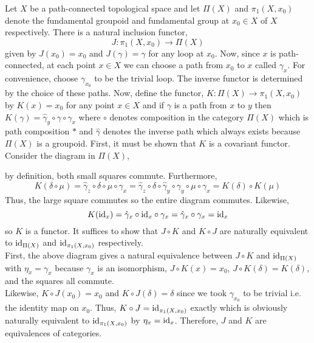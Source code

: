 \documentclass[12pt]{extarticle}
\begin{document}
Let $X$ be a path-connected topological space and let $\Pi(X)$ and $\pi_1(X, x_0)$ denote the fundamental groupoid and fundamental group at $x_0 \in X$ of $X$ respectively. There is a natural inclusion functor,
\[ J : \pi_1(X, x_0) \to \Pi(X) \]
given by $J(x_0) = x_0$ and $J(\gamma) = \gamma$ for any loop at $x_0$. Now, since $x$ is path-connected, at each point $x \in X$ we can choose a path from $x_0$ to $x$ called $\gamma_x$. For convenience, choose $\gamma_{x_0}$ to be the trivial loop. The inverse functor is determined by the choice of these paths. Now, define the functor, $K : \Pi(X) \to \pi_1(X, x_0)$ by $K(x) = x_0$ for any point $x \in X$ and if $\gamma$ is a path from $x$ to $y$ then $K(\gamma) = \hat{\gamma}_{y} \circ \gamma \circ \gamma_{x}$ where $\circ$ denotes composition in the category $\Pi(X)$ which is path composition $*$ and $\hat{\gamma}$ denotes the inverse path which always exists because $\Pi(X)$ is a groupoid. First, it must be shown that $K$ is a covariant functor. Consider the diagram in $\Pi(X)$,
\begin{center}
\end{center}
by definition, both small squares commute. Furthermore, 
\[K(\delta \circ \mu) = \hat{\gamma}_{z} \circ \delta \circ \mu \circ \gamma_x = \hat{\gamma}_{z} \circ \delta \circ \hat{\gamma}_y \circ \gamma_y \circ \mu \circ \gamma_x = K(\delta) \circ K(\mu)\]
Thus, the large square commutes so the entire diagram commutes. Likewise, \[K(\mathrm{id}_x) = \hat{\gamma}_x \circ \mathrm{id}_x \circ \gamma_x = \hat{\gamma}_x \circ \gamma_x = \mathrm{id}_x\]
so $K$ is a functor. It suffices to show that $J \circ K$ and $K \circ J$ are naturally equivalent to $\mathrm{id}_{\Pi(X)}$ and $\mathrm{id}_{\pi_1(X, x_0)}$ respectively. \bigskip \\
First, the above diagram gives a natural equivalence between $J \circ K$ and $\mathrm{id}_{\Pi(X)}$ with $\eta_x = \gamma_x$ because $\gamma_x$ is an isomorphism, $J \circ K(x) = x_0$, $J \circ K(\delta) = K(\delta)$, and the squares all commute.  
\bigskip \\
Likewise, $K \circ J(x_0) = x_0$ and $K \circ J(\delta) = \delta$ since we took $\gamma_{x_0}$ to be trivial i.e. the identity map on $x_0$. Thus, $K \circ J = \mathrm{id}_{\pi_1(X, x_0)}$ exactly which is obviously naturally equivalent to $\mathrm{id}_{\pi_1(X, x_0)}$  by $\eta_x = \mathrm{id}_x$. Therefore, $J$ and $K$ are equivalences of categories.  
\end{document}
